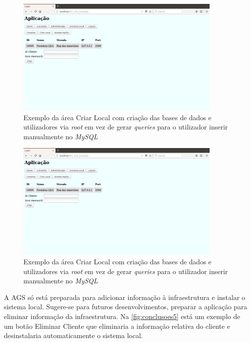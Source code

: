 \documentclass[11pt,twoside,a4paper]{report}
\begin{document}
\begin{figure}[H]
	\begin{center}
		\includegraphics[width=0.9\textwidth]{futuro01} %
		\caption{Exemplo da área Criar Local com criação das bases de dados e utilizadores via \textit{root} em vez de gerar \textit{queries} para o utilizador inserir manualmente no \textit{MySQL}}
		\label{fig:conclusoes11}
	\end{center}
\end{figure}
\begin{figure}[H]
	\begin{center}
		\includegraphics[width=0.9\textwidth]{futuro01} %
		\caption{Exemplo da área Criar Local com criação das bases de dados e utilizadores via \textit{root} em vez de gerar \textit{queries} para o utilizador inserir manualmente no \textit{MySQL}}
		\label{fig:conclusoes12}
	\end{center}
\end{figure}
A AGS só está preparada para adicionar informação à infraestrutura e instalar o sistema local. Sugere-se para futuros desenvolvimentos, preparar a aplicação para eliminar informação da infraestrutura. Na \autoref{fig:conclusoes5} está um exemplo de um botão Eliminar Cliente que eliminaria a informação relativa do cliente e desinstalaria automaticamente o sistema local.
\end{document}
